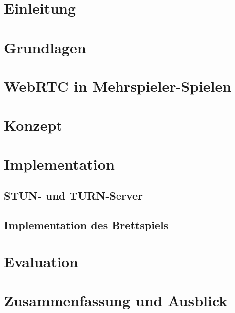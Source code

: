 \documentclass[oneside,11pt,a4paper,bibliography=totocnumbered,numbers=noenddot]{scrreprt}
\begin{document}
 					
\begin{titlepage}

\end{titlepage}

\thispagestyle{empty}
\cleardoublepage
{}




\cleardoublepage
{}			%
\begin{singlespace}

\chapter{Einleitung}
  

\chapter{Grundlagen}
  

\chapter{WebRTC in Mehrspieler-Spielen}
  

\chapter{Konzept}
  

\chapter{Implementation}
  
  \section{STUN- und TURN-Server}
  
  \section{Implementation des Brettspiels}
  

\chapter{Evaluation}
  

\chapter{Zusammenfassung und Ausblick}
  



  
  \clearpage
  
  \end{singlespace}
\end{document}

